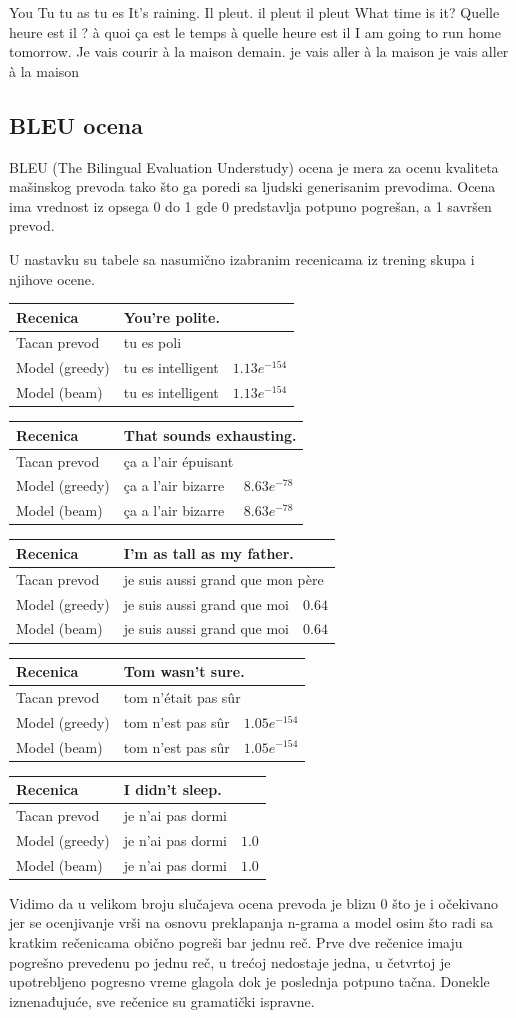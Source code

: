 \documentclass[a4paper]{article}
\begin{document}
\translation
{You}
{Tu}
{tu as}
{tu es}
\translation
{It's raining.}
{Il pleut.}
{il pleut}
{il pleut}
\translation
{What time is it?}
{Quelle heure est il ?}
{à quoi ça est le temps}
{à quelle heure est il}
\translation
{I am going to run home tomorrow.}
{Je vais courir à la maison demain.}
{je vais aller à la maison}
{je vais aller à la maison}

\subsection{BLEU ocena}

\newcommand\translationscore[6] 
{\begin{center}
  \begin{tabularx}{\textwidth}{ |l|X|l| } 
    \hline
    Recenica & \multicolumn{2}{|l|}{#1} \\
    \hline
    Tacan prevod & \multicolumn{2}{|l|}{#2} \\
    \hline
    Model (greedy) & #3 & #4 \\
    \hline
    Model (beam) & #5 & #6 \\
    \hline
  \end{tabularx}
\end{center}}

BLEU (The Bilingual Evaluation Understudy) ocena je mera za ocenu kvaliteta mašinskog prevoda tako što ga poredi sa ljudski generisanim prevodima. Ocena ima vrednost iz opsega 0 do 1 gde 0 predstavlja potpuno pogrešan, a 1 savršen prevod.

U nastavku su tabele sa nasumično izabranim recenicama iz trening skupa i njihove ocene.

\translationscore
{You're polite.}
{tu es poli}
{tu es intelligent}{$1.13e^{-154}$}
{tu es intelligent}{$1.13e^{-154}$}
\translationscore
{That sounds exhausting.}
{ça a l'air épuisant}
{ça a l'air bizarre}{$8.63e^{-78}$}
{ça a l'air bizarre}{$8.63e^{-78}$}
\translationscore
{I'm as tall as my father.}
{je suis aussi grand que mon père}
{je suis aussi grand que moi}{$0.64$}
{je suis aussi grand que moi}{$0.64$}
\translationscore
{Tom wasn't sure.}
{tom n'était pas sûr}
{tom n'est pas sûr}{$1.05e^{-154}$}
{tom n'est pas sûr}{$1.05e^{-154}$}
\translationscore
{I didn't sleep.}
{je n'ai pas dormi}
{je n'ai pas dormi}{$1.0$}
{je n'ai pas dormi}{$1.0$}

Vidimo da u velikom broju slučajeva ocena prevoda je blizu 0 što je i očekivano jer se ocenjivanje vrši na osnovu preklapanja n-grama a model osim što radi sa kratkim rečenicama obično pogreši bar jednu reč.
Prve dve rečenice imaju pogrešno prevedenu po jednu reč, u trećoj nedostaje jedna, u četvrtoj je upotrebljeno pogresno vreme glagola dok je poslednja potpuno tačna.
Donekle iznenađujuće, sve rečenice su gramatički ispravne.
\end{document}

